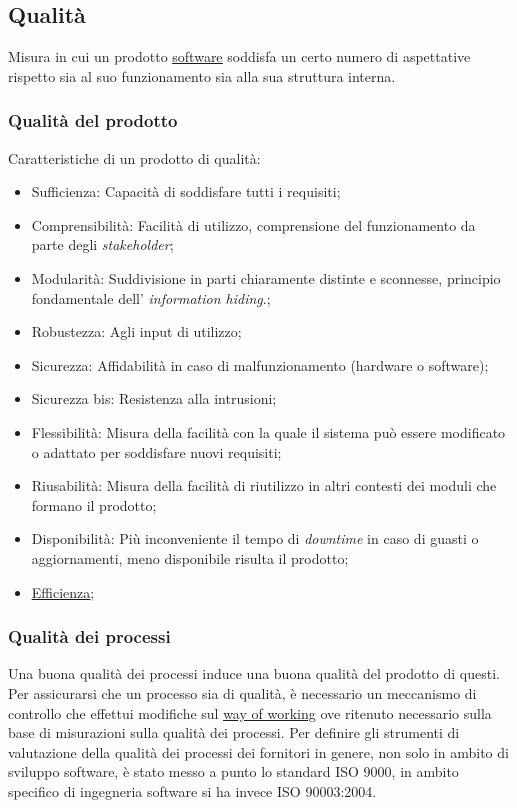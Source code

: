 	
	\subsection{Qualità}
	\label{sec:qualita}
	 Misura in cui un prodotto \underline{\hyperref[sec:prodottosoftware]{software}} soddisfa un certo numero di aspettative rispetto sia al suo funzionamento sia alla sua struttura interna.
	\subsubsection{Qualità del prodotto}
	\label{sec:qualitaprodotto}
	Caratteristiche di un prodotto di qualità:
	\begin{itemize}
	\item Sufficienza: Capacità di soddisfare tutti i requisiti;
	\item Comprensibilità: Facilità di utilizzo, comprensione del funzionamento da parte degli  \emph{stakeholder};
	\item Modularità: Suddivisione in parti chiaramente distinte e sconnesse, principio fondamentale dell' \emph{information hiding}.;
	\item Robustezza: Agli input di utilizzo;
	\item Sicurezza: Affidabilità in caso di malfunzionamento (hardware o software);
	\item Sicurezza bis: Resistenza alla intrusioni;
	\item Flessibilità: Misura della facilità con la quale il sistema può essere modificato o adattato per soddisfare nuovi requisiti;
	\item Riusabilità: Misura della facilità di riutilizzo in altri contesti dei moduli che formano il prodotto;
	\item Disponibilità: Più inconveniente il tempo di \emph{downtime} in caso di guasti o aggiornamenti, meno disponibile risulta il prodotto;
	\item \underline{\hyperref[sec:efficienza]{Efficienza}};
	\end{itemize}
	\subsubsection{Qualità dei processi}
	\label{sec:qualitaprocesso}
	Una buona qualità dei processi induce una buona qualità del prodotto di questi. Per assicurarsi che un processo sia di qualità, è necessario un meccanismo di controllo che effettui modifiche sul \underline{\hyperref[sec:wow]{\underline{\hyperref[sec:wow]{way of working}}}} ove ritenuto necessario sulla base di misurazioni sulla qualità dei processi. Per definire gli strumenti di valutazione della qualità dei processi dei fornitori in genere, non solo in ambito di sviluppo software, è stato messo a punto lo standard ISO 9000, in ambito specifico di ingegneria software si ha invece ISO 90003:2004.

